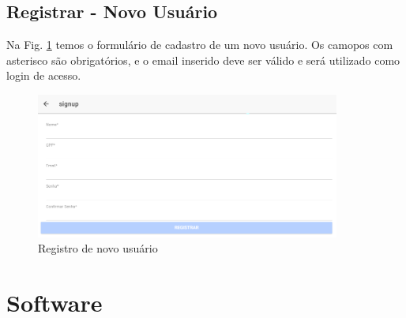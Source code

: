 \documentclass[letterpaper, 12 pt]{article}
\begin{document}
\subsection{Registrar - Novo Usuário}
Na  Fig. \ref{figura:registrar1} temos o formulário de cadastro de um novo usuário. Os camopos com asterisco são obrigatórios, e o email inserido deve ser válido e será utilizado como login de acesso. 

\begin{figure}[h]


\centering %
\includegraphics[width=10cm]{imagens/registrar1.PNG} %
\caption{Registro de novo usuário}
\label{figura:registrar1}
\end{figure}

\section{Software}

%

\end{document}
